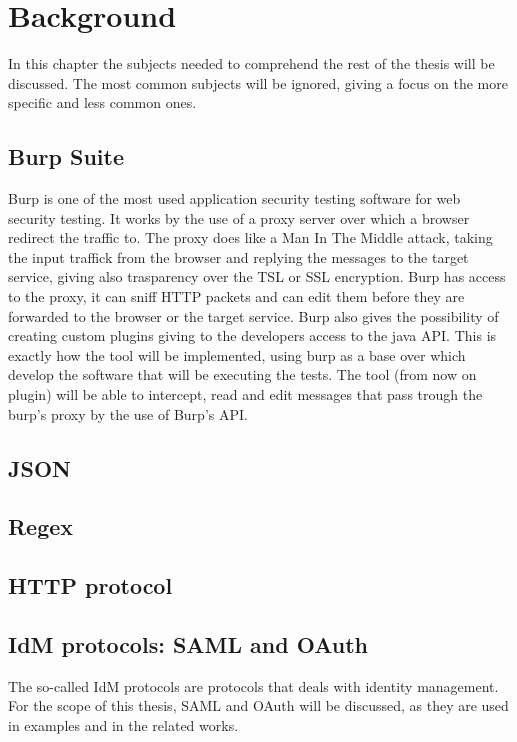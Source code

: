 \printglossary

\chapter{Background}
In this chapter the subjects needed to comprehend the rest of the thesis will be discussed. The most common subjects will be ignored, giving a focus on the more specific and less common ones.

\section{Burp Suite}
Burp is one of the most used application security testing software for web security testing. It works by the use of a proxy server over which a browser redirect the traffic to. The proxy does like a Man In The Middle attack, taking the input traffick from the browser and replying the messages to the target service, giving also trasparency over the TSL or SSL encryption. Burp has access to the proxy, it can sniff HTTP packets and can edit them before they are forwarded to the browser or the target service. Burp also gives the possibility of creating custom plugins giving to the developers access to the java API. This is exactly how the tool will be implemented, using burp as a base over which develop the software that will be executing the tests. The tool (from now on plugin) will be able to intercept, read and edit messages that pass trough the burp's proxy by the use of Burp's API.

\section{JSON}


\section{Regex}


\section{HTTP protocol}


\section{IdM protocols: SAML and OAuth}
The so-called IdM protocols are protocols that deals with identity management. For the scope of this thesis, SAML and OAuth will be discussed, as they are used in examples and in the related works.


